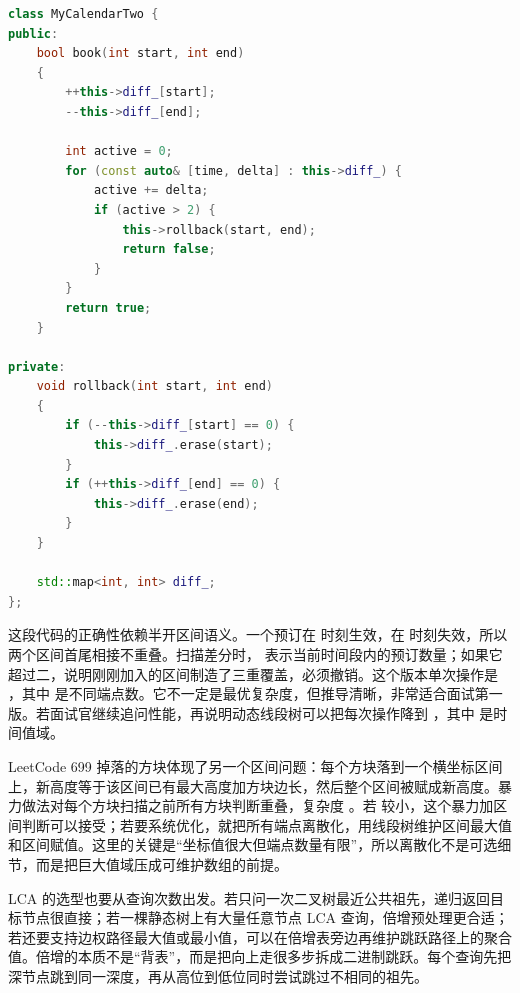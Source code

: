 \begin{lstlisting}[language=C++,caption={LeetCode 731：有序差分检查三重预订}]
class MyCalendarTwo {
public:
    bool book(int start, int end)
    {
        ++this->diff_[start];
        --this->diff_[end];

        int active = 0;
        for (const auto& [time, delta] : this->diff_) {
            active += delta;
            if (active > 2) {
                this->rollback(start, end);
                return false;
            }
        }
        return true;
    }

private:
    void rollback(int start, int end)
    {
        if (--this->diff_[start] == 0) {
            this->diff_.erase(start);
        }
        if (++this->diff_[end] == 0) {
            this->diff_.erase(end);
        }
    }

    std::map<int, int> diff_;
};
\end{lstlisting}

这段代码的正确性依赖半开区间语义。一个预订在  时刻生效，在  时刻失效，所以两个区间首尾相接不重叠。扫描差分时， 表示当前时间段内的预订数量；如果它超过二，说明刚刚加入的区间制造了三重覆盖，必须撤销。这个版本单次操作是 ，其中  是不同端点数。它不一定是最优复杂度，但推导清晰，非常适合面试第一版。若面试官继续追问性能，再说明动态线段树可以把每次操作降到 ，其中  是时间值域。

LeetCode 699 掉落的方块体现了另一个区间问题：每个方块落到一个横坐标区间上，新高度等于该区间已有最大高度加方块边长，然后整个区间被赋成新高度。暴力做法对每个方块扫描之前所有方块判断重叠，复杂度 。若  较小，这个暴力加区间判断可以接受；若要系统优化，就把所有端点离散化，用线段树维护区间最大值和区间赋值。这里的关键是“坐标值很大但端点数量有限”，所以离散化不是可选细节，而是把巨大值域压成可维护数组的前提。

LCA 的选型也要从查询次数出发。若只问一次二叉树最近公共祖先，递归返回目标节点很直接；若一棵静态树上有大量任意节点 LCA 查询，倍增预处理更合适；若还要支持边权路径最大值或最小值，可以在倍增表旁边再维护跳跃路径上的聚合值。倍增的本质不是“背表”，而是把向上走很多步拆成二进制跳跃。每个查询先把深节点跳到同一深度，再从高位到低位同时尝试跳过不相同的祖先。

